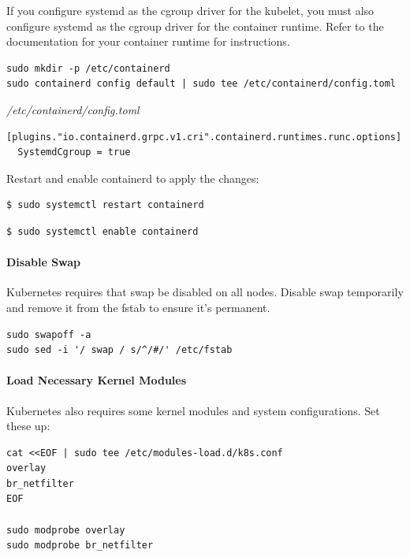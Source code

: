 \documentclass{article}
\newenvironment{codetemplate}[1][]{%
  \mybasecolorbox[#1]
  \itshape
}{%
  \endmybasecolorbox
}
\begin{document}
If you configure systemd as the cgroup driver for the kubelet, you must also configure systemd as the cgroup driver for the container runtime. Refer to the documentation for your container runtime for instructions. 

\begin{codetemplate}{}
\begin{verbatim}
sudo mkdir -p /etc/containerd
sudo containerd config default | sudo tee /etc/containerd/config.toml
\end{verbatim}
\end{codetemplate}
\begin{codetemplate}{/etc/containerd/config.toml}
\begin{verbatim}
[plugins."io.containerd.grpc.v1.cri".containerd.runtimes.runc.options]
  SystemdCgroup = true
\end{verbatim}
\end{codetemplate}

Restart and enable containerd to apply the changes:
\begin{codetemplate}{}
\begin{verbatim}
$ sudo systemctl restart containerd
\end{verbatim}
\end{codetemplate}
\begin{codetemplate}{}
\begin{verbatim}
$ sudo systemctl enable containerd
\end{verbatim}
\end{codetemplate}

\paragraph{Disable Swap}
Kubernetes requires that swap be disabled on all nodes. Disable swap temporarily and remove it from the fstab to ensure it's permanent.

\begin{codetemplate}{}
\begin{verbatim}
sudo swapoff -a
sudo sed -i '/ swap / s/^/#/' /etc/fstab
\end{verbatim}
\end{codetemplate}

\paragraph{Load Necessary Kernel Modules}
Kubernetes also requires some kernel modules and system configurations. Set these up:
\begin{codetemplate}{}
\begin{verbatim}
cat <<EOF | sudo tee /etc/modules-load.d/k8s.conf
overlay
br_netfilter
EOF

sudo modprobe overlay
sudo modprobe br_netfilter
\end{verbatim}
\end{codetemplate}
\end{document}
